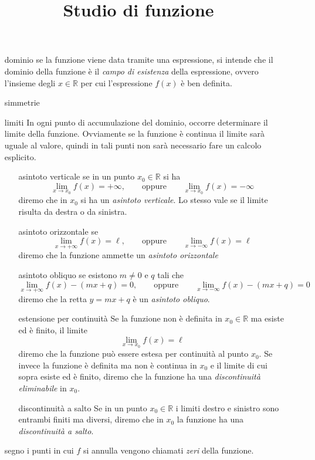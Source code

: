 \documentclass[italian,a4paper]{article}
\title{Studio di funzione}
\begin{document}
\begin{enumerate}

\item[dominio] se la funzione viene data tramite una espressione, si
  intende che il dominio della funzione è il \emph{campo di esistenza}
  della espressione, ovvero l'insieme degli $x\in \mathbb R$ per cui
  l'espressione $f(x)$ è ben definita.

\item[simmetrie]

\item[limiti]
  In ogni punto di accumulazione del dominio, occorre determinare il
  limite della funzione. Ovviamente se la funzione è continua il
  limite sarà uguale al valore, quindi in tali punti non sarà
  necessario fare un calcolo esplicito.
  \begin{enumerate}
  \item[asintoto verticale] se in un punto $x_0 \in \mathbb R$ si ha
    \[
    \lim_{x\to x_0} f(x) = +\infty,\qquad\text{oppure}\qquad
    \lim_{x\to x_0} f(x) = -\infty
    \]
    diremo che in $x_0$ si ha un \emph{asintoto verticale}. Lo stesso
    vale se il limite risulta da destra o da sinistra.
  \item[asintoto orizzontale] se
    \[
    \lim_{x\to +\infty} f(x) = \ell,\qquad\text{oppure}\qquad
    \lim_{x\to -\infty} f(x) = \ell
    \]
    diremo che la funzione ammette un \emph{asintoto orizzontale}
  \item[asintoto obliquo] se esistono $m\neq 0$ e $q$ tali che
    \[
    \lim_{x\to +\infty} f(x) - (mx+q) = 0,\qquad\text{oppure}\qquad
    \lim_{x\to -\infty} f(x) - (mx+q) = 0
    \]
    diremo che la retta $y=m x + q$ è un \emph{asintoto
      obliquo}.
  \item[estensione per continuità]
    Se la funzione non è definita in $x_0\in \mathbb R$ ma esiste ed è
    finito, il limite
    \[
    \lim_{x\to x_0} f(x) = \ell
    \]
    diremo che la funzione può essere estesa per continuità al punto
    $x_0$.
    Se invece la funzione è definita ma non è continua in $x_0$ e il
    limite di cui sopra esiste ed è finito, diremo che la funzione ha
    una \emph{discontinuità eliminabile} in $x_0$.
  \item[discontinuità a salto]
    Se in un punto $x_0\in \mathbb R$ i limiti destro e sinistro sono
    entrambi finiti ma diversi, diremo che in $x_0$ la funzione ha una
    \emph{discontinuità a salto}.
  \end{enumerate}

  \item[segno] i punti in cui $f$ si annulla vengono chiamati
    \emph{zeri} della funzione.


\end{enumerate}
\end{document}
